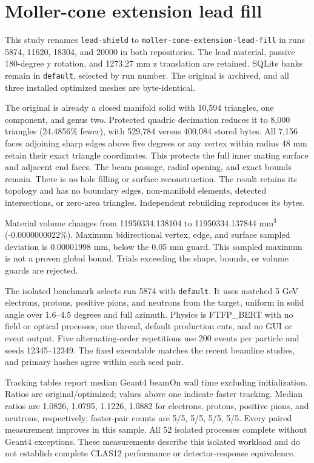 \FloatBarrier
\section{Moller-cone extension lead fill}
\label{sec:extension_lead}

This study renames \texttt{lead-\allowbreak{}shield} to
\texttt{moller-\allowbreak{}cone-\allowbreak{}extension-\allowbreak{}lead-\allowbreak{}fill} in runs 5874,
11620, 18304, and 20000 in both repositories. The lead material, passive 180-degree y rotation, and 1273.27 mm
z translation are retained. SQLite banks remain in \texttt{default}, selected by run number. The original is
archived, and all three installed optimized meshes are byte-identical.

The original is already a closed manifold solid with 10,594 triangles, one component, and genus two. Protected
quadric decimation reduces it to 8,000 triangles (24.4856\% fewer), with 529,784 versus 400,084 stored bytes.
All 7,156 faces adjoining sharp edges above five degrees or any vertex within radius 48 mm retain their exact
triangle coordinates. This protects the full inner mating surface and adjacent end faces. The beam passage,
radial opening, and exact bounds remain. There is no hole filling or surface reconstruction. The result
retains its topology and has no boundary edges, non-manifold elements, detected intersections, or zero-area
triangles. Independent rebuilding reproduces its bytes.

Material volume changes from 11950334.138104 to 11950334.137844 mm$^3$ (-0.0000000022\%). Maximum
bidirectional vertex, edge, and surface sampled deviation is 0.00001998 mm, below the 0.05 mm guard. This
sampled maximum is not a proven global bound. Trials exceeding the shape, bounds, or volume guards are
rejected.

The isolated benchmark selects run 5874 with \texttt{default}. It uses matched 5 GeV electrons, protons,
positive pions, and neutrons from the target, uniform in solid angle over 1.6--4.5 degrees and full azimuth.
Physics is FTFP\_BERT with no field or optical processes, one thread, default production cuts, and no GUI or
event output. Five alternating-order repetitions use 200 events per particle and seeds 12345--12349. The fixed
executable matches the recent beamline studies, and primary hashes agree within each seed pair.

Tracking tables report median Geant4 beamOn wall time excluding initialization. Ratios are original/optimized;
values above one indicate faster tracking. Median ratios are 1.0826, 1.0795, 1.1226, 1.0882 for electrons,
protons, positive pions, and neutrons, respectively; faster-pair counts are 5/5, 5/5, 5/5, 5/5. Every paired
measurement improves in this sample. All 52 isolated processes complete without Geant4 exceptions. These
measurements describe this isolated workload and do not establish complete CLAS12 performance or
detector-response equivalence.

